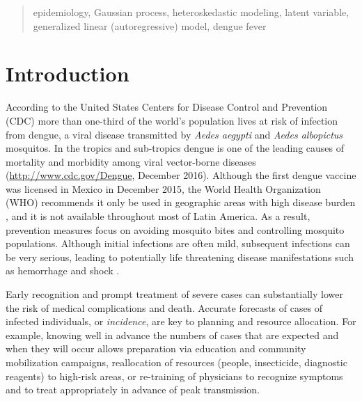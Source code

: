 \documentclass[12pt]{article}
\begin{document}
\begin{abstract}
  \bigskip
  epidemiology, Gaussian process, heteroskedastic modeling, latent variable, generalized linear (autoregressive) model, dengue fever
\end{abstract}




\section{Introduction}
\label{sec:intro}

According to the United States Centers for Disease Control and Prevention
(CDC) more than one-third of the world's population lives at risk of infection
from dengue, a viral disease transmitted by {\it Aedes aegypti} and {\it Aedes
albopictus} mosquitos. In the tropics and sub-tropics dengue is one of the
leading causes of mortality and morbidity among viral vector-borne diseases
(\url{http://www.cdc.gov/Dengue}, December 2016).  Although the first dengue
vaccine was licensed in Mexico in December 2015, the World Health Organization
(WHO) recommends it only be used in geographic areas with high disease burden
\citep{WHO:denguevaccine:2016}, and it is not available throughout most of
Latin America. As a result, prevention measures focus on avoiding mosquito bites
and controlling mosquito populations. %
Although initial infections are often mild, subsequent infections can be very
serious, leading to potentially life threatening disease manifestations such
as hemorrhage and shock \citep{WHOdengue:2009}.

Early recognition and prompt treatment of severe cases can substantially lower
the risk of medical complications and death. Accurate forecasts of cases of
infected individuals, or {\em incidence}, are key to planning and resource
allocation. For example, knowing well in advance the numbers of cases that are
expected and when they will occur allows preparation via education and
community mobilization campaigns, reallocation of resources  (people,
insecticide, diagnostic reagents) to high-risk areas, or re-training of
physicians to recognize symptoms and to treat appropriately
\citep{kuhn:etal:2005,degallier:etal:2010,thomson:etal:2008} in advance of
peak transmission. %
\end{document}
